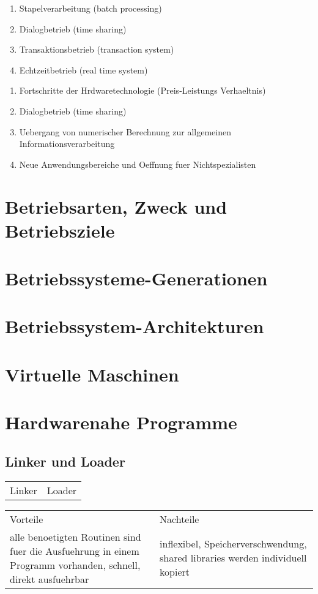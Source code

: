 \begin{enumerate}
	\setlength\itemsep{0em}
	\item Stapelverarbeitung (batch processing)
	\item Dialogbetrieb (time sharing)
	\item Transaktionsbetrieb (transaction system)
	\item Echtzeitbetrieb (real time system)
\end{enumerate}

\begin{enumerate}
	\setlength\itemsep{0em}
	\item Fortschritte der Hrdwaretechnologie (Preis-Leistungs Verhaeltnis)
	\item Dialogbetrieb (time sharing)
	\item Uebergang von numerischer Berechnung zur allgemeinen Informationsverarbeitung
	\item Neue Anwendungsbereiche und Oeffnung fuer Nichtspezialisten 
\end{enumerate}

\section{Betriebsarten, Zweck und Betriebsziele}

\section{Betriebssysteme-Generationen}

\section{Betriebssystem-Architekturen}

\section{Virtuelle Maschinen}

\section{Hardwarenahe Programme}
\subsection{Linker und Loader}
\begin{tabularx}{\textwidth}{X X}
	Linker&			Loader \\
\end{tabularx}

\begin{tabularx}{\textwidth}{X X}
	Vorteile& Nachteile\\
	alle benoetigten Routinen sind fuer die Ausfuehrung in einem Programm vorhanden, schnell, direkt ausfuehrbar& inflexibel, Speicherverschwendung, shared libraries werden individuell kopiert\\ 
\end{tabularx}

